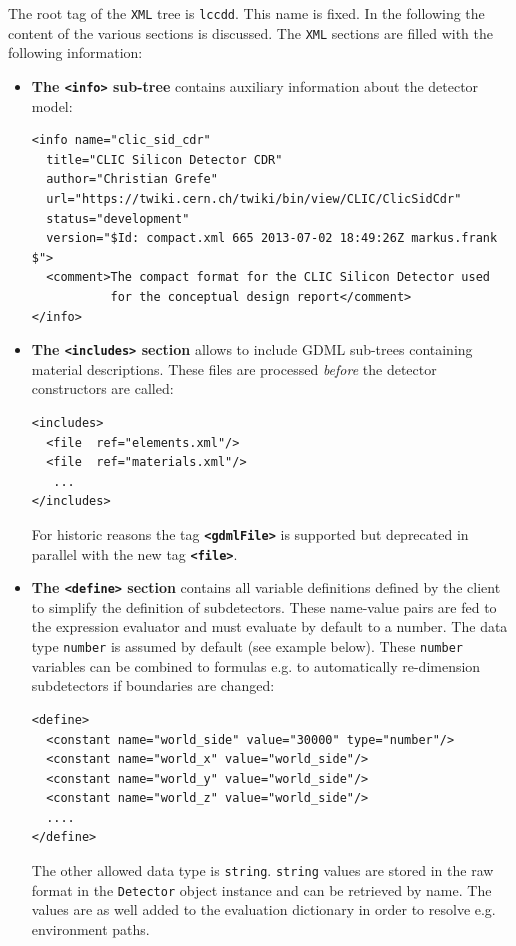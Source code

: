 The root tag of the \texttt{XML} tree is {\texttt{lccdd}}. This name is fixed. In the following the content of the various sections is discussed. The \texttt{XML} sections are filled with the following information:
\begin{itemize}
\item {\textbf{The \texttt{<info>} sub-tree}} contains auxiliary information about the detector model:
\begin{verbatim}
<info name="clic_sid_cdr"
  title="CLIC Silicon Detector CDR"
  author="Christian Grefe"
  url="https://twiki.cern.ch/twiki/bin/view/CLIC/ClicSidCdr"
  status="development"
  version="$Id: compact.xml 665 2013-07-02 18:49:26Z markus.frank $">
  <comment>The compact format for the CLIC Silicon Detector used 
           for the conceptual design report</comment>
</info>
\end{verbatim}

\item {\textbf{The \texttt{<includes>} section}} allows to include GDML sub-trees containing material descriptions. These files are processed {\textit{before}} the detector constructors are called:
\begin{verbatim}
<includes>
  <file  ref="elements.xml"/>
  <file  ref="materials.xml"/>
   ...
</includes>
\end{verbatim}
For historic reasons the tag {\textbf{\texttt{<gdmlFile>}}} is supported but deprecated in parallel
with the new tag {\textbf{\texttt{<file>}}}.


\item {\textbf{The \texttt{<define>} section}} contains all variable definitions defined by the client to simplify the definition of subdetectors. These name-value pairs are fed to the expression evaluator and must evaluate by default to a number. The data type
  {\texttt{number}} is assumed by default (see example below).
These {\texttt{number}} variables can be combined to formulas e.g. to automatically re-dimension subdetectors if boundaries are changed:
\begin{verbatim}
<define>
  <constant name="world_side" value="30000" type="number"/>
  <constant name="world_x" value="world_side"/>
  <constant name="world_y" value="world_side"/>
  <constant name="world_z" value="world_side"/>
  ....
</define>
\end{verbatim}
The other allowed data type is {\texttt{string}}. {\texttt{string}} values are stored in the raw format in the {\texttt{Detector}} object instance and can be retrieved by name. The values are as well added to the evaluation dictionary in order to resolve e.g. environment paths.


\end{itemize}
